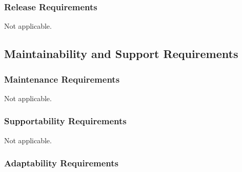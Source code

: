 \documentclass[12pt, titlepage]{article}
\begin{document}
\subsubsection{Release Requirements}
Not applicable.

\subsection{Maintainability and Support Requirements}

\subsubsection{Maintenance Requirements}
Not applicable.
\subsubsection{Supportability Requirements}
Not applicable.

\subsubsection{Adaptability Requirements}
\end{document}
